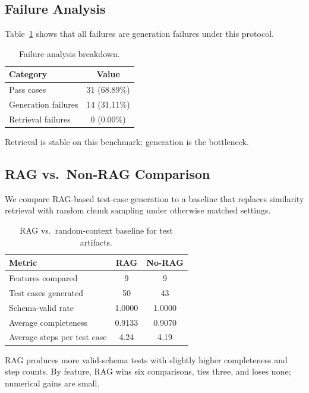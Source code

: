 \documentclass[conference]{IEEEtran}
\begin{document}
\subsection{Failure Analysis}

Table~\ref{tab:failure_analysis} shows that all failures are generation failures under this protocol.

\begin{table}[h]
\centering
\caption{Failure analysis breakdown.}
\label{tab:failure_analysis}
\begin{tabular}{lc}
\hline
Category & Value \\
\hline
Pass cases & 31 (68.89\%) \\
Generation failures & 14 (31.11\%) \\
Retrieval failures & 0 (0.00\%) \\
\hline
\end{tabular}
\end{table}

Retrieval is stable on this benchmark; generation is the bottleneck.

\subsection{RAG vs.\ Non-RAG Comparison}

We compare RAG-based test-case generation to a baseline that replaces similarity retrieval with random chunk sampling under otherwise matched settings.

\begin{table}[h]
\centering
\caption{RAG vs.\ random-context baseline for test artifacts.}
\label{tab:rag_vs_norag}
\begin{tabular}{lcc}
\hline
Metric & RAG & No-RAG \\
\hline
Features compared & 9 & 9 \\
Test cases generated & 50 & 43 \\
Schema-valid rate & 1.0000 & 1.0000 \\
Average completeness & 0.9133 & 0.9070 \\
Average steps per test case & 4.24 & 4.19 \\
\hline
\end{tabular}
\end{table}

RAG produces more valid-schema tests with slightly higher completeness and step counts. By feature, RAG wins six comparisons, ties three, and loses none; numerical gains are small.
\end{document}

